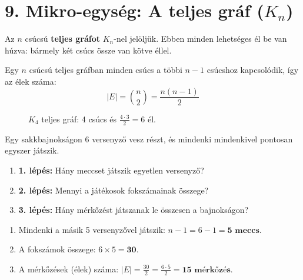 \documentclass[a4paper,12pt]{article}
\begin{document}
\vspace{0.4cm}
\section{9. Mikro-egység: A teljes gráf (\texorpdfstring{$K_n$}{Kn})}

\begin{definiciodoboz}
Az $n$ csúcsú \textbf{teljes gráfot} $K_n$-nel jelöljük. Ebben minden lehetséges él be van húzva: bármely két csúcs össze van kötve éllel.
\end{definiciodoboz}

Egy $n$ csúcsú teljes gráfban minden csúcs a többi $n-1$ csúcshoz kapcsolódik, így az élek száma:
\begin{equation}
    |E| = \binom{n}{2} = \frac{n(n - 1)}{2}
\end{equation}

\begin{figure}[H]
    \centering
    \caption{$K_4$ teljes gráf: 4 csúcs és $\frac{4 \cdot 3}{2} = 6$ él.}
\end{figure}

\begin{feladatdoboz}
Egy sakkbajnokságon 6 versenyző vesz részt, és mindenki mindenkivel pontosan egyszer játszik.
\begin{enumerate}[label=\alph*)]
    \item \textbf{1. lépés:} Hány meccset játszik egyetlen versenyző?
    \item \textbf{2. lépés:} Mennyi a játékosok fokszámainak összege?
    \item \textbf{3. lépés:} Hány mérkőzést játszanak le összesen a bajnokságon?
\end{enumerate}
\end{feladatdoboz}

\begin{megoldasdoboz}
\begin{enumerate}[label=\alph*)]
    \item Mindenki a másik 5 versenyzővel játszik: $n - 1 = 6 - 1 = \mathbf{5\text{ meccs}}$.
    \item A fokszámok összege: $6 \times 5 = \mathbf{30}$.
    \item A mérkőzések (élek) száma: $|E| = \frac{30}{2} = \frac{6 \cdot 5}{2} = \mathbf{15\text{ mérkőzés}}$.
\end{enumerate}
\end{megoldasdoboz}
\end{document}
